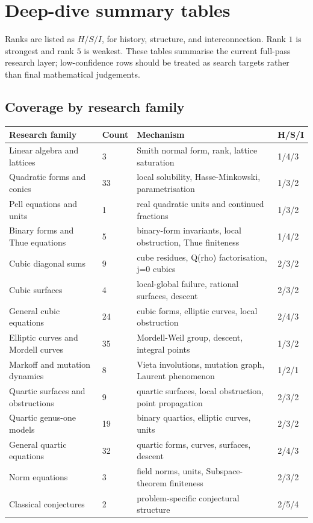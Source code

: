 \section*{Deep-dive summary tables}

Ranks are listed as \(H/S/I\), for history, structure, and interconnection. Rank \(1\) is strongest and rank \(5\) is weakest. These tables summarise the current full-pass research layer; low-confidence rows should be treated as search targets rather than final mathematical judgements.

\providecommand{\LECLink}[1]{\hyperlink{eq:#1}{\texttt{#1}}}

\begingroup
\scriptsize
\renewcommand{\arraystretch}{1.05}
\setlength{\tabcolsep}{3pt}

\subsection*{Coverage by research family}
\begin{center}
\begin{tabular}{@{}p{}p{}p{}p{}@{}}
\toprule
Research family & Count & Mechanism & H/S/I \\
\midrule
Linear algebra and lattices & 3 & Smith normal form, rank, lattice saturation & 1/4/3 \\
Quadratic forms and conics & 33 & local solubility, Hasse-Minkowski, parametrisation & 1/3/2 \\
Pell equations and units & 1 & real quadratic units and continued fractions & 1/3/2 \\
Binary forms and Thue equations & 5 & binary-form invariants, local obstruction, Thue finiteness & 1/4/2 \\
Cubic diagonal sums & 9 & cube residues, Q(rho) factorisation, j=0 cubics & 2/3/2 \\
Cubic surfaces & 4 & local-global failure, rational surfaces, descent & 2/3/2 \\
General cubic equations & 24 & cubic forms, elliptic curves, local obstruction & 2/4/3 \\
Elliptic curves and Mordell curves & 35 & Mordell-Weil group, descent, integral points & 1/3/2 \\
Markoff and mutation dynamics & 8 & Vieta involutions, mutation graph, Laurent phenomenon & 1/2/1 \\
Quartic surfaces and obstructions & 9 & quartic surfaces, local obstruction, point propagation & 2/3/2 \\
Quartic genus-one models & 19 & binary quartics, elliptic curves, units & 2/3/2 \\
General quartic equations & 32 & quartic forms, curves, surfaces, descent & 2/4/3 \\
Norm equations & 3 & field norms, units, Subspace-theorem finiteness & 2/3/2 \\
Classical conjectures & 2 & problem-specific conjectural structure & 2/5/4 \\
\bottomrule
\end{tabular}
\end{center}

